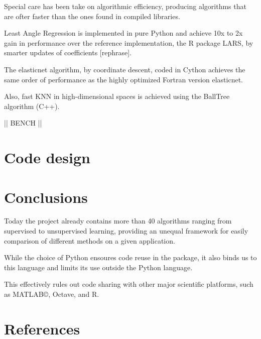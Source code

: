 \documentclass[twoside,11pt]{article}
\begin{document}
Special care has been take on algorithmic efficiency, producing
algorithms that are ofter faster than the ones found in compiled
libraries.

Least Angle Regression is implemented in pure Python and achieve 10x
to 2x gain in performance over the reference implementation, the R
package LARS, by smarter updates of coefficients [rephrase].


The elasticnet algorithm, by coordinate descent, coded in Cython
achieves the same order of performance as the highly optimized Fortran
version elasticnet.

Also, fast KNN in high-dimensional spaces is achieved using the
BallTree algorithm (C++).

|| BENCH ||

\section{Code design}




\section{Conclusions}

Today the project already contains more than 40 algorithms ranging
from supervised to unsupervised learning, providing an unequal
framework for easily comparison of different methods on a given
application.



While the choice of Python ensoures code reuse in the package, it also
binds us to this language and limits its use outside the Python
language.

This effectively rules out code sharing with other major scientific
platforms, such as MATLAB©, Octave, and R.



\section{References}
\end{document}
